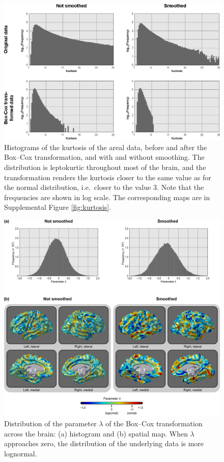 \begin{figure}[!p]  %
\centering
\includegraphics[width=14cm]{images/kurtosis-hist.eps}
\caption[Histograms of the kurtosis of the areal data.]{Histograms of the kurtosis of the areal data, before and after the Box--Cox transformation, and with and without smoothing. The distribution is leptokurtic throughout most of the brain, and the transformation renders the kurtosis closer to the same value as for the normal distribution, i.e.\ closer to the value 3.  Note that the frequencies are shown in log scale. The corresponding maps are in Supplemental Figure \ref{fig:kurtosis}.}
\label{fig:kurtosis-hist}
\end{figure}

\begin{figure}[!p]  %
\centering
\includegraphics[width=14cm]{images/boxcox.png}
\caption[Spatial distribution of the parameter $\lambda$.]{Distribution of the parameter $\lambda$ of the Box--Cox transformation across the brain: (a) histogram and (b) spatial map. When $\lambda$ approaches zero, the distribution of the underlying data is more lognormal.}
\label{fig:boxcox}
\end{figure}

